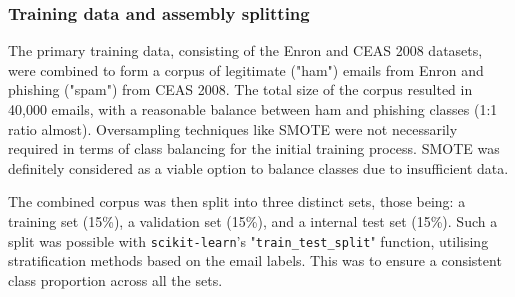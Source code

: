 
\subsubsection*{Training data and assembly splitting}
The primary training data, consisting of the Enron and CEAS 2008 datasets, were combined to form a corpus of legitimate ("ham") emails from Enron and phishing ("spam") from CEAS 2008. The total size of the corpus resulted in 40,000 emails, with a reasonable balance between ham and phishing classes (1:1 ratio almost). Oversampling techniques like SMOTE were not necessarily required in terms of class balancing for the initial training process. SMOTE was definitely considered as a viable option to balance classes due to insufficient data.\newline

\noindent The combined corpus was then split into three distinct sets, those being: a training set (15\%), a validation set (15\%), and a internal test set (15\%). Such a split was possible with \texttt{scikit-learn}'s "\texttt{train\_test\_split}" function, utilising stratification methods based on the email labels. This was to ensure a consistent class proportion across all the sets.
